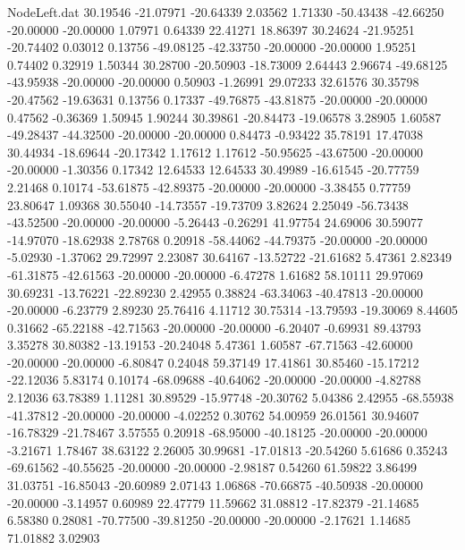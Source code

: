 \begin{filecontents}{NodeLeft.dat}
  30.19546  -21.07971  -20.64339     2.03562    1.71330  -50.43438  -42.66250  -20.00000  -20.00000    1.07971    0.64339   22.41271   18.86397
  30.24624  -21.95251  -20.74402     0.03012    0.13756  -49.08125  -42.33750  -20.00000  -20.00000    1.95251    0.74402    0.32919    1.50344
  30.28700  -20.50903  -18.73009     2.64443    2.96674  -49.68125  -43.95938  -20.00000  -20.00000    0.50903   -1.26991   29.07233   32.61576
  30.35798  -20.47562  -19.63631     0.13756    0.17337  -49.76875  -43.81875  -20.00000  -20.00000    0.47562   -0.36369    1.50945    1.90244
  30.39861  -20.84473  -19.06578     3.28905    1.60587  -49.28437  -44.32500  -20.00000  -20.00000    0.84473   -0.93422   35.78191   17.47038
  30.44934  -18.69644  -20.17342     1.17612    1.17612  -50.95625  -43.67500  -20.00000  -20.00000   -1.30356    0.17342   12.64533   12.64533
  30.49989  -16.61545  -20.77759     2.21468    0.10174  -53.61875  -42.89375  -20.00000  -20.00000   -3.38455    0.77759   23.80647    1.09368
  30.55040  -14.73557  -19.73709     3.82624    2.25049  -56.73438  -43.52500  -20.00000  -20.00000   -5.26443   -0.26291   41.97754   24.69006
  30.59077  -14.97070  -18.62938     2.78768    0.20918  -58.44062  -44.79375  -20.00000  -20.00000   -5.02930   -1.37062   29.72997    2.23087
  30.64167  -13.52722  -21.61682     5.47361    2.82349  -61.31875  -42.61563  -20.00000  -20.00000   -6.47278    1.61682   58.10111   29.97069
  30.69231  -13.76221  -22.89230     2.42955    0.38824  -63.34063  -40.47813  -20.00000  -20.00000   -6.23779    2.89230   25.76416    4.11712
  30.75314  -13.79593  -19.30069     8.44605    0.31662  -65.22188  -42.71563  -20.00000  -20.00000   -6.20407   -0.69931   89.43793    3.35278
  30.80382  -13.19153  -20.24048     5.47361    1.60587  -67.71563  -42.60000  -20.00000  -20.00000   -6.80847    0.24048   59.37149   17.41861
  30.85460  -15.17212  -22.12036     5.83174    0.10174  -68.09688  -40.64062  -20.00000  -20.00000   -4.82788    2.12036   63.78389    1.11281
  30.89529  -15.97748  -20.30762     5.04386    2.42955  -68.55938  -41.37812  -20.00000  -20.00000   -4.02252    0.30762   54.00959   26.01561
  30.94607  -16.78329  -21.78467     3.57555    0.20918  -68.95000  -40.18125  -20.00000  -20.00000   -3.21671    1.78467   38.63122    2.26005
  30.99681  -17.01813  -20.54260     5.61686    0.35243  -69.61562  -40.55625  -20.00000  -20.00000   -2.98187    0.54260   61.59822    3.86499
  31.03751  -16.85043  -20.60989     2.07143    1.06868  -70.66875  -40.50938  -20.00000  -20.00000   -3.14957    0.60989   22.47779   11.59662
  31.08812  -17.82379  -21.14685     6.58380    0.28081  -70.77500  -39.81250  -20.00000  -20.00000   -2.17621    1.14685   71.01882    3.02903

\end{filecontents}
